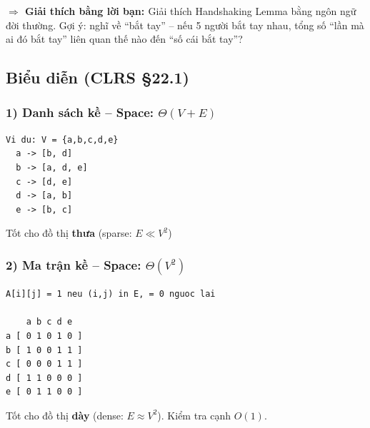 \documentclass[10pt]{article}
\newcommand{\feynman}[1]{%
  \begin{tcolorbox}[colback=violet!5!white, colframe=violet!60!white, leftrule=3pt,
    toprule=0pt, bottomrule=0pt, rightrule=0pt,
    boxsep=2pt, left=6pt, right=6pt, top=4pt, bottom=4pt]
  {\small\textbf{\textcolor{violet!80!black}{$\Rightarrow$ Giải thích bằng lời bạn: }} #1}
  \end{tcolorbox}}
\begin{document}
\feynman{Giải thích Handshaking Lemma bằng ngôn ngữ đời thường. Gợi ý: nghĩ về ``bắt tay'' -- nếu 5 người bắt tay nhau, tổng số ``lần mà ai đó bắt tay'' liên quan thế nào đến ``số cái bắt tay''?}

\subsection{\texorpdfstring{Biểu diễn (CLRS
\S 22.1)}{Biểu diễn (CLRS 22.1)}}\label{biux1ec3u-diux1ec5n-clrs-22.1}

\subsubsection{\texorpdfstring{1) Danh sách kề -- Space:
\(\Theta(V + E)\)}{1) Danh sách kề -- Space: \textbackslash Theta(V + E)}}\label{danh-suxe1ch-kux1ec1-space-thetav-e}

\begin{tcolorbox}[colback=gray!8, colframe=gray!50, boxrule=0.5pt, arc=2pt,
  left=6pt, right=6pt, top=4pt, bottom=4pt,
  title={\small\textbf{Pseudocode 10: Danh sách kề (Adjacency List)}}]
\begin{verbatim}
Vi du: V = {a,b,c,d,e}
  a -> [b, d]
  b -> [a, d, e]
  c -> [d, e]
  d -> [a, b]
  e -> [b, c]
\end{verbatim}
\end{tcolorbox}

Tốt cho đồ thị \textbf{thưa} (sparse: \(E \ll V^2\))

\subsubsection{\texorpdfstring{2) Ma trận kề -- Space:
\(\Theta(V^2)\)}{2) Ma trận kề -- Space: \textbackslash Theta(V\^{}2)}}\label{ma-trux1eadn-kux1ec1-space-thetav2}

\begin{tcolorbox}[colback=gray!8, colframe=gray!50, boxrule=0.5pt, arc=2pt,
  left=6pt, right=6pt, top=4pt, bottom=4pt,
  title={\small\textbf{Pseudocode 11: Ma trận kề (Adjacency Matrix)}}]
\begin{verbatim}
A[i][j] = 1 neu (i,j) in E, = 0 nguoc lai

    a b c d e
a [ 0 1 0 1 0 ]
b [ 1 0 0 1 1 ]
c [ 0 0 0 1 1 ]
d [ 1 1 0 0 0 ]
e [ 0 1 1 0 0 ]
\end{verbatim}
\end{tcolorbox}

Tốt cho đồ thị \textbf{dày} (dense: \(E \approx V^2\)). Kiểm tra cạnh
\(O(1)\).
\end{document}
